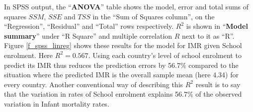 In SPSS output, the ``\textbf{ANOVA}'' table shows the model, error and
total sums of squares $SSM$, $SSE$ and $TSS$ in the ``Sum of Squares
column'', on the ``Regression'', ``Residual'' and ``Total'' rows
respectively. $R^{2}$ is shown in ``\textbf{Model summary}'' under ``R
Square'' and multiple correlation $R$ next to it as ``R''. Figure
\ref{f_spss_linreg} shows these results for the model for IMR given
School enrolment. Here $R^{2}=0.567$. Using each country's level of
school enrolment to predict its IMR thus reduces the prediction errors
by 56.7\% compared to the situation where the predicted IMR is the
overall sample mean (here 4.34) for every country. Another
conventional way of describing this $R^{2}$ result is to say that the
variation in rates of School enrolment explains 56.7\% of the observed
variation in Infant mortality rates.

